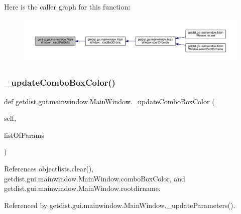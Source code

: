 Here is the caller graph for this function\+:
\nopagebreak
\begin{figure}[H]
\begin{center}
\leavevmode
\includegraphics[width=350pt]{classgetdist_1_1gui_1_1mainwindow_1_1MainWindow_a3e7c9caefe4a820ec6d2f2d1cf7a41c8_icgraph}
\end{center}
\end{figure}
\mbox{\label{classgetdist_1_1gui_1_1mainwindow_1_1MainWindow_a70759462a72f7fb41af9c795b0318346}} 
\subsubsection{\texorpdfstring{\+\_\+update\+Combo\+Box\+Color()}{\_updateComboBoxColor()}}
{\footnotesize\ttfamily def getdist.\+gui.\+mainwindow.\+Main\+Window.\+\_\+update\+Combo\+Box\+Color (\begin{DoxyParamCaption}\item[{}]{self,  }\item[{}]{list\+Of\+Params }\end{DoxyParamCaption})\hspace{0.3cm}{\ttfamily [private]}}



References objectlists.\+clear(), getdist.\+gui.\+mainwindow.\+Main\+Window.\+combo\+Box\+Color, and getdist.\+gui.\+mainwindow.\+Main\+Window.\+rootdirname.



Referenced by getdist.\+gui.\+mainwindow.\+Main\+Window.\+\_\+update\+Parameters().

